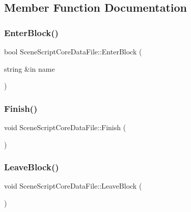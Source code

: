 \subsection{Member Function Documentation}
\hypertarget{class_scene_script_core_data_file_a7f82cc20ea137b18c14f1c8c95f3addd}{}\label{class_scene_script_core_data_file_a7f82cc20ea137b18c14f1c8c95f3addd} 
\subsubsection{\texorpdfstring{Enter\+Block()}{EnterBlock()}}
{\footnotesize\ttfamily bool Scene\+Script\+Core\+Data\+File\+::\+Enter\+Block (\begin{DoxyParamCaption}\item[{string \&in}]{name }\end{DoxyParamCaption})}

\hypertarget{class_scene_script_core_data_file_ad8040ee64763a7fca44af443bfc2911e}{}\label{class_scene_script_core_data_file_ad8040ee64763a7fca44af443bfc2911e} 
\subsubsection{\texorpdfstring{Finish()}{Finish()}}
{\footnotesize\ttfamily void Scene\+Script\+Core\+Data\+File\+::\+Finish (\begin{DoxyParamCaption}{ }\end{DoxyParamCaption})}

\hypertarget{class_scene_script_core_data_file_a7c7903602f39ac0ef03cb43d0e822319}{}\label{class_scene_script_core_data_file_a7c7903602f39ac0ef03cb43d0e822319} 
\subsubsection{\texorpdfstring{Leave\+Block()}{LeaveBlock()}}
{\footnotesize\ttfamily void Scene\+Script\+Core\+Data\+File\+::\+Leave\+Block (\begin{DoxyParamCaption}{ }\end{DoxyParamCaption})}

